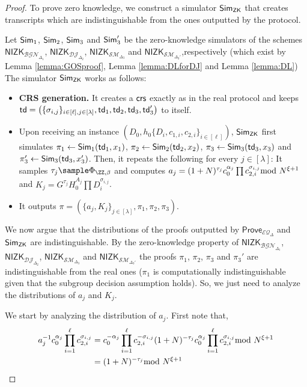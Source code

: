 \begin{proof}
To prove zero knowledge, we construct a simulator $\mathsf{Sim}_\mathsf{ZK}$ that creates transcripts which are indistinguishable from the ones outputted by the protocol.

Let $\mathsf{Sim}_1$, $\mathsf{Sim}_2$, $\mathsf{Sim}_3$ and $\mathsf{Sim}_3'$ be the zero-knowledge simulators of the schemes $\mathsf{NIZK}_{\mathcal{BGN}_{\Delta_1}}$, $\mathsf{NIZK}_{\mathcal{DJ}_{\Delta_2}}$, $\mathsf{NIZK}_{\mathcal{SM}_{\Delta_3}}$ and $\mathsf{NIZK}_{\mathcal{SM}_{\Delta_3'}}$,respectively (which exist by Lemma \ref{lemma:GOSproof}, Lemma \ref{lemma:DLforDJ} and Lemma \ref{lemma:DL}) The simulator $\mathsf{Sim}_\mathsf{ZK}$ works as follows:
\begin{itemize}
    \item \textbf{CRS generation.} It creates a $\mathsf{crs}$ exactly as in the real protocol and keeps $\mathsf{td}=\left(\{\sigma_{i,j}\}_{{i}\in[\ell],j\in [\lambda]},\mathsf{td}_1,\mathsf{td}_2,\mathsf{td}_3,\mathsf{td}_3'\right)$ to itself.
    \item Upon receiving an instance $(D_0,h_0\{D_i,c_{1,i},c_{2,i}\}_{i\in [\ell]})$, $\mathsf{Sim}_\mathsf{ZK}$ first simulates $\pi_1\leftarrow\mathsf{Sim}_1(\mathsf{td}_1,x_1)$, $\pi_2\leftarrow\mathsf{Sim}_2(\mathsf{td}_2,x_2)$, $\pi_3\leftarrow\mathsf{Sim}_3(\mathsf{td}_3,x_3)$ and $\pi_3'\leftarrow\mathsf{Sim}_3(\mathsf{td}_3,x'_3)$. Then, it repeats the following for every $j\in [\lambda]$: It samples $\tau_{j}\sample \Phi_{\ZZ,\beta}$ and computes $a_{j}=(1+N)^{\tau_{j}}c_0^{\alpha_j} \prod c_{2,i}^{\sigma_{i,j}}\!\!\!\!\mod N^{\xi+1}$ and $K_j=G^{\tau_{j}}H_0^{A_j}\prod D_i^{\sigma_{i,j}}$.
    \item It outputs $\pi=(\{a_{j},K_j\}_{j\in [\lambda]},\pi_1,\pi_2,\pi_3)$.
\end{itemize}
We now argue that the distributions of the proofs outputted by $\mathsf{Prove}_{\mathcal{EQ}_\Delta}$ and $\mathsf{Sim}_\mathsf{ZK}$ are indistinguishable. By the zero-knowledge property of $\mathsf{NIZK}_{\mathcal{BGN}_{\Delta_1}}$, $\mathsf{NIZK}_{\mathcal{DJ}_{\Delta_2}}$, $\mathsf{NIZK}_{\mathcal{SM}_{\Delta_3}}$ and $\mathsf{NIZK}_{\mathcal{SM}_{\Delta_3'}}$ the proofs $\pi_1$, $\pi_2$, $\pi_3$ and $\pi_3'$ are indistinguishable from the real ones ($\pi_1$ is computationally indistinguishable given that the subgroup decision assumption holds). So, we just need to analyze the distributions of $a_{j}$ and $K_j$.


We start by analyzing the distribution of $a_{j}$. First note that, \begin{align*}
    a_{j}^{-1}c_0^{\alpha_j}\prod_{i=1}^\ell c_{2,i}^{\sigma_{i,j}}& =c_0^{-\alpha_j}\prod_{i=1}^\ell c_{2,i}^{-\sigma_{i,j}}(1+N)^{-\tau_{j}} c_0^{\alpha_j} \prod_{i=1}^\ell  c_{2,i}^{\sigma_{i,j}} \smod N^{\xi+1}\\ 
     & = (1+N)^{-\tau_{j}}\smod N^{\xi+1}
\end{align*}



\end{proof}
